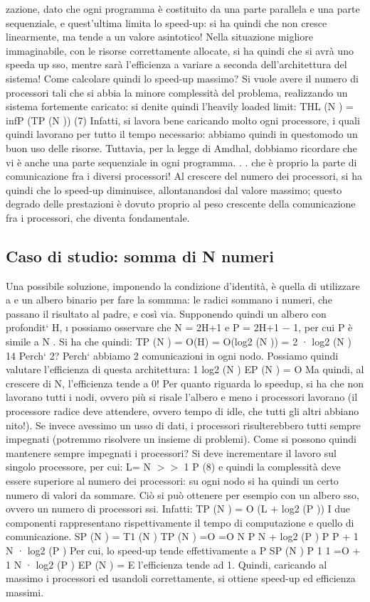 zazione, dato che ogni programma è costituito da una parte parallela e una
parte sequenziale, e quest'ultima limita lo speed-up: si ha quindi che non cresce
linearmente, ma tende a un valore asintotico! Nella situazione migliore immaginabile, con le risorse correttamente
allocate, si ha quindi che si avrà uno speeda
up sso, mentre sarà l'efficienza a variare a seconda dell'architettura del sistema!
Come calcolare quindi lo speed-up massimo? Si vuole avere il numero di
processori tali che si abbia la minore complessità del problema, realizzando un
sistema fortemente caricato: si denite quindi l'heavily loaded limit:
THL (N ) = infP (TP (N ))
(7)
Infatti, si lavora bene caricando molto ogni processore, i quali quindi lavorano
per tutto il tempo necessario: abbiamo quindi in questomodo un buon uso delle
risorse.
Tuttavia, per la legge di Amdhal, dobbiamo ricordare che vi è anche una
parte sequenziale in ogni programma. . . che è proprio la parte di comunicazione
fra i diversi processori! Al crescere del numero dei processori, si ha quindi
che lo speed-up diminuisce, allontanandosi dal valore massimo; questo degrado
delle prestazioni è dovuto proprio al peso crescente della comunicazione fra i
processori, che diventa fondamentale.
\subsection{Caso di studio: somma di N numeri}
Una possibile soluzione, imponendo la condizione d'identità, è quella di utilizzare
a e
un albero binario per fare la sommma: le radici sommano i numeri, che passano
il risultato al padre, e così via. Supponendo quindi un albero con profondit` H,
\i{}
possiamo osservare che N = 2H+1 e P = 2H+1 $-$ 1, per cui P è simile a N . Si
ha che quindi:
TP (N ) = O(H)
= O(log2 (N ))
= 2 · log2 (N )
14
Perch` 2? Perch` abbiamo 2 comunicazioni in ogni nodo. Possiamo quindi
valutare l'efficienza di questa architettura:
1
log2 (N )
EP (N ) = O
Ma quindi, al crescere di N, l'efficienza tende a 0! Per quanto riguarda lo speedup, si ha che non lavorano tutti i
nodi,
ovvero più si risale l'albero e meno i
processori lavorano (il processore radice deve attendere, ovvero tempo di idle,
che tutti gli altri abbiano nito!). Se invece avessimo un usso di dati, i processori risulterebbero tutti sempre
impegnati (potremmo risolvere un insieme di
problemi).
Come si possono quindi mantenere sempre impegnati i processori? Si deve
incrementare il lavoro sul singolo processore, per cui:
L=
N
$>$$>$ 1
P
(8)
e quindi la complessità deve essere superiore al numero dei processori: su ogni
nodo si ha quindi un certo numero di valori da sommare. Ciò si può ottenere
per esempio con un albero sso, ovvero un numero di processori ssi. Infatti:
TP (N ) = O (L + log2 (P ))
I due componenti rappresentano rispettivamente il tempo di computazione e
quello di comunicazione.
SP (N ) =
T1 (N )
TP (N )
=O
=O
N
P
N
+ log2 (P )
P
P
+
1
N · log2 (P )
Per cui, lo speed-up tende effettivamente a P
SP (N )
P
1
1
=O
+
1 N · log2 (P )
EP (N ) =
E l'efficienza tende ad 1. Quindi, caricando al massimo i processori ed usandoli
correttamente, si ottiene speed-up ed efficienza massimi.
